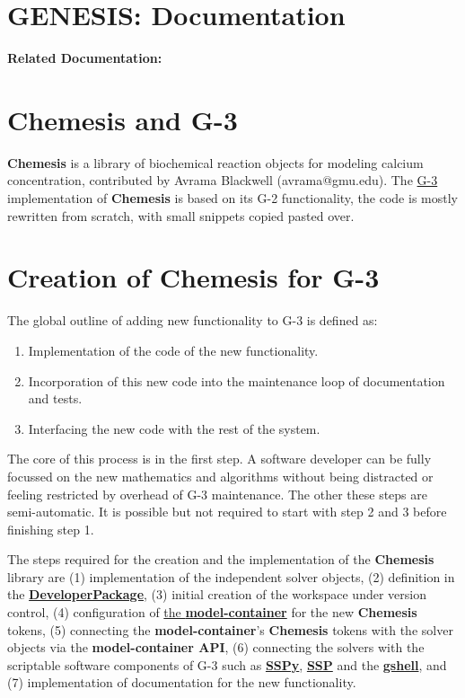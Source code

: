 \documentclass[12pt]{article}
\begin{document}
\section*{GENESIS: Documentation}

{\bf Related Documentation:}

\section*{Chemesis and G-3}

{\bf Chemesis} is a library of biochemical reaction objects for
modeling calcium
concentration\cite{blackwell02:_neuros_datab_pract_guide}, contributed
by Avrama Blackwell (avrama@gmu.edu).  The
\href{../genesis-overview/genesis-overview.tex}{G-3} implementation of
{\bf Chemesis} is based on its G-2 functionality, the code is mostly
rewritten from scratch, with small snippets copied pasted over.

\section*{Creation of {\bf Chemesis} for G-3}

The global outline of adding new functionality to G-3 is defined as:
\begin{enumerate}
\item Implementation of the code of the new functionality.
\item Incorporation of this new code into the maintenance loop of
  documentation and tests.
\item Interfacing the new code with the rest of the system.
\end{enumerate}

The core of this process is in the first step.  A software developer
can be fully focussed on the new mathematics and algorithms without
being distracted or feeling restricted by overhead of G-3 maintenance.
The other these steps are semi-automatic.  It is possible but not
required to start with step 2 and 3 before finishing step 1.

The steps required for the creation and the implementation of the {\bf
  Chemesis} library are (1) implementation of the independent solver
objects, (2) definition in the
\href{../developer-package/developer-package.tex}{\bf
  DeveloperPackage}, (3) initial creation of the workspace under
version control, (4) configuration of
\href{model-container/model-container.tex}{the {\bf model-container}}
for the new {\bf Chemesis} tokens, (5) connecting the {\bf
  model-container}'s {\bf Chemesis} tokens with the solver objects via
the {\bf model-container API}, (6) connecting the solvers with the
scriptable software components of G-3 such as
\href{../sspy/sspy.tex}{\bf SSPy}, \href{../ssp/ssp.tex}{\bf SSP} and
the \href{../gshell/gshell.tex}{\bf gshell}, and (7) implementation of
documentation for the new functionality.
\end{document}
